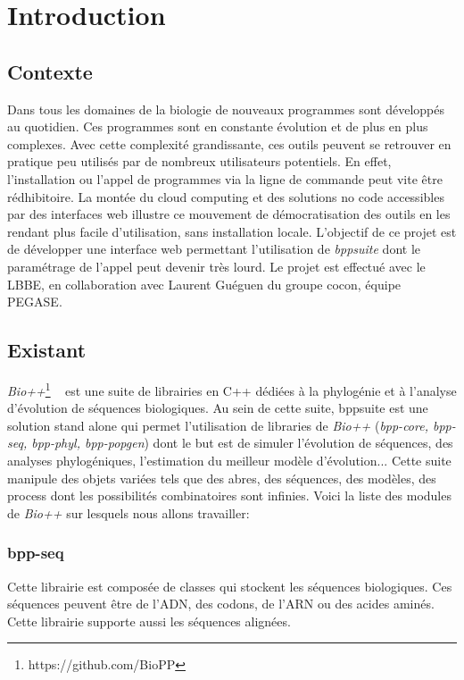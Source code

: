 \section{Introduction}

\subsection{Contexte}
	Dans tous les domaines de la biologie de nouveaux programmes sont développés au quotidien. Ces programmes sont en constante évolution et de plus en plus complexes. Avec cette complexité grandissante, ces outils peuvent se retrouver en pratique peu utilisés par de nombreux utilisateurs potentiels. En effet, l'installation ou l'appel de programmes via la ligne de commande peut vite être rédhibitoire.
	La montée du cloud computing et des solutions no code accessibles par des interfaces web illustre ce mouvement de démocratisation des outils en les rendant plus facile d'utilisation, sans installation locale.
	L'objectif de ce projet est de développer une interface web permettant l'utilisation de \textit{bppsuite} dont le paramétrage de l'appel peut devenir très lourd.
	Le projet est effectué avec le LBBE, en collaboration avec Laurent Guéguen du groupe cocon, équipe PEGASE.
	
	
\subsection{Existant}
	\textit{Bio++}\footnote{https://github.com/BioPP} ~\cite{Guéguen} est une suite de librairies en C++ dédiées à la phylogénie et à l'analyse d'évolution de séquences biologiques. Au sein de cette suite, bppsuite est une solution stand alone qui permet l'utilisation de libraries de \textit{Bio++} (\textit{bpp-core, bpp-seq, bpp-phyl, bpp-popgen}) dont le but est de simuler l'évolution de séquences, des analyses phylogéniques, l'estimation du meilleur modèle d'évolution... Cette suite manipule des objets variées tels que des abres, des séquences, des modèles, des process dont les possibilités combinatoires sont infinies. Voici la liste des modules de \textit{Bio++} sur lesquels nous allons travailler:
	
	\subsubsection*{bpp-seq}
	Cette librairie est composée de classes qui stockent les séquences biologiques. Ces séquences peuvent être de l'ADN, des codons, de l'ARN ou des acides aminés. Cette librairie supporte aussi les séquences alignées.
	
